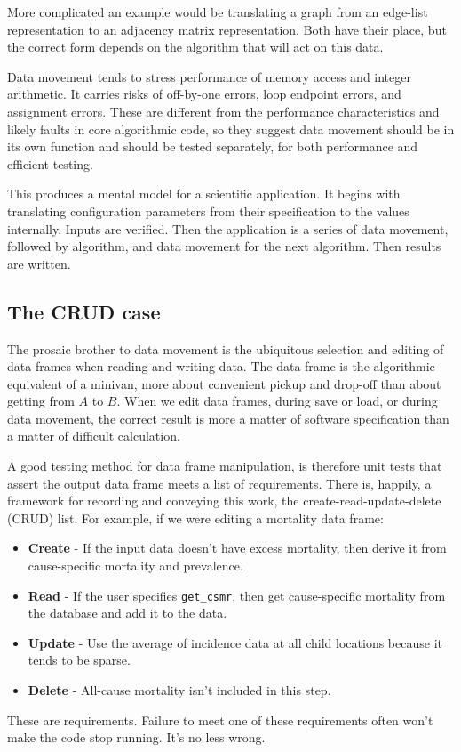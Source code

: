 \documentclass[fleqn,10pt]{olplainarticle}
\begin{document}
More complicated an example would be translating a graph from
an edge-list representation to an adjacency matrix representation.
Both have their place, but the correct form depends on the
algorithm that will act on this data.

Data movement tends to stress performance of memory access
and integer arithmetic. It carries risks of off-by-one errors,
loop endpoint errors, and assignment errors. These are different
from the performance characteristics and likely faults in core
algorithmic code, so they suggest data movement should be in its
own function and should be tested separately, for both performance
and efficient testing.

This produces a mental model for a scientific application. It begins
with translating configuration parameters from their specification
to the values internally. Inputs are verified. Then the application
is a series of data movement, followed by algorithm, and data movement
for the next algorithm. Then results are written.

\subsection{The CRUD case}\label{sec:crud}

The prosaic brother to data movement is the ubiquitous selection
and editing of data frames when reading and writing data.
The data frame is the algorithmic equivalent of a minivan, more
about convenient pickup and drop-off than about getting from $A$
to $B$. When we edit data frames, during save or load, or during
data movement, the correct result is more a matter of software specification
than a matter of difficult calculation.

A good testing method for data frame manipulation, is therefore
unit tests that assert the output data frame meets a list of requirements.
There is, happily, a framework
for recording and conveying this work, the create-read-update-delete
(CRUD) list. For example, if we were editing a mortality data frame:
\begin{itemize}
\item \textbf{Create} - If the input data doesn't have excess mortality,
  then derive it from cause-specific mortality and prevalence.
\item \textbf{Read} - If the user specifies \lstinline!get_csmr!, then get cause-specific
  mortality from the database and add it to the data.
\item \textbf{Update} - Use the average of incidence data at all child
  locations because it tends to be sparse.
\item \textbf{Delete} - All-cause mortality isn't included in this step.
\end{itemize}
These are requirements. Failure to meet one of these requirements
often won't make the code stop running. It's no less wrong.
\end{document}

